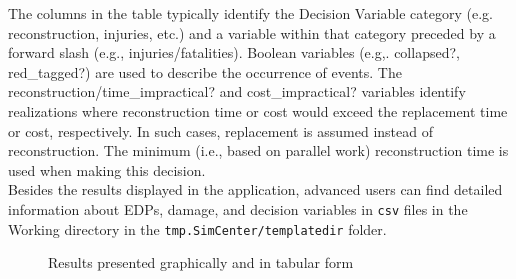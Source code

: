 The columns in the table typically identify the Decision Variable category (e.g. reconstruction, injuries, etc.) and a variable within that category preceded by a forward slash (e.g., injuries/fatalities). Boolean variables (e.g,. collapsed?, red\_tagged?) are used to describe the occurrence of events. The reconstruction/time\_impractical? and cost\_impractical? variables identify realizations where reconstruction time or cost would exceed the replacement time or cost, respectively. In such cases, replacement is assumed instead of reconstruction. The minimum (i.e., based on parallel work) reconstruction time is used when making this decision.\\

Besides the results displayed in the application, advanced users can find detailed information about EDPs, damage, and decision variables in \texttt{csv} files in the Working directory in the \texttt{tmp.SimCenter/templatedir} folder. 

\begin{figure}[!htbp]
  \caption{Results presented graphically and in tabular form}
  \label{fig:results_data}
\end{figure}